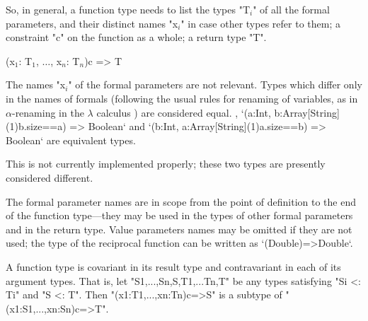 So, in general, a function type needs to list the types 
\xcdmath"T$_i$"
of all the formal parameters,
and their distinct names \xcdmath"x$_i$" in case other types refer to them; a
constraint 
\xcd"c" on the
function as a whole; a return type \xcd"T".

\begin{xtenmath}
(x$_1$: T$_1$, $\dots$, x$_n$: T$_n$){c} => T
\end{xtenmath}


The names \xcdmath"x$_i$" of the formal parameters are not relevant.  Types
which differ only in the names of formals (following the usual rules for
renaming of variables, as in {$\alpha$}-renaming in the {$\lambda$} calculus
) are considered equal.  \Eg, 
\xcd`(a:Int, b:Array[String](1){b.size==a}) => Boolean`
and 
\xcd`(b:Int, a:Array[String](1){a.size==b}) => Boolean`
are equivalent types.

\limitationx{}
This is not currently implemented properly; these two types are presently
considered different.

The formal parameter names are in scope from the point of definition to the
end of the function type---they may be used in the types of other formal parameters
and in the return type. 
Value parameters names may be
omitted if they are not used; the type of the reciprocal function can be
written as
\xcd`(Double)=>Double`. 







A function type is covariant in its result type and contravariant in
each of its argument types. That is, let 
\xcd"S1,...,Sn,S,T1,...Tn,T" be any
types satisfying \xcd"Si <: Ti" and \xcd"S <: T". Then
\xcd"(x1:T1,...,xn:Tn){c}=>S" is a subtype of
\xcd"(x1:S1,...,xn:Sn){c}=>T".



